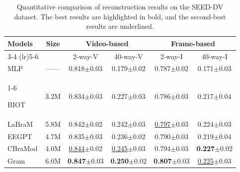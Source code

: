 \documentclass{article}
\begin{document}
\begin{table}[ht]
\footnotesize
\setlength{\tabcolsep}{2pt}

    \raggedright %
    \begin{tabular}{l c |c c c c}  
        \midrule
        \multirow{1}[3]{*}{Models} & \multirow{1}[3]{*}{Size} 
        & \multicolumn{2}{c}{Video-based} &
         \multicolumn{2}{c}{Frame-based} \\
        \cmidrule(lr){3-4} \cmidrule(lr){5-6}
        \multirow{1}{*}{} & \multirow{1}{*}{}
        & \multicolumn{1}{c}{2-way-V} 
        & \multicolumn{1}{c}{40-way-V}
        & \multicolumn{1}{c}{2-way-I} 
        & \multicolumn{1}{c}{40-way-I}\\       
        
        \midrule
        
        
       {MLP} & ------ & {{0.818\scriptsize{$\pm0.03$}}} & {0.179\scriptsize{$\pm0.02$}} & {{0.787\scriptsize{$\pm0.02$}}} & {0.171\scriptsize{$\pm0.03$}}   \\
        \cmidrule(lr){1-6}
        
        
        BIOT \cite{yang2023biot} & 3.2M& {{0.834\scriptsize{$\pm0.03$}}} & {0.227\scriptsize{$\pm0.03$}} & {{0.786\scriptsize{$\pm0.03$}}} & {0.217\scriptsize{$\pm0.04$}}   \\
        
        {LaBraM \cite{jiang2024large}} & 5.8M &{{0.842\scriptsize{$\pm0.02$}}} & {0.242\scriptsize{$\pm0.03$}} & \underline{{0.797\scriptsize{$\pm0.03$}}} & {0.224\scriptsize{$\pm0.03$}}   \\
        
        {EEGPT \cite{yue2024eegpt}} & 4.7M &{{0.835\scriptsize{$\pm0.03$}}} & {0.236\scriptsize{$\pm0.02$}} & {{0.790\scriptsize{$\pm0.03$}}} & {0.219\scriptsize{$\pm0.04$}}    \\
        {CBraMod \cite{wang2024cbramod}} & 4.0M &\underline{{0.844\scriptsize{$\pm0.02$}}} & \underline{0.245\scriptsize{$\pm0.03$}} & {{0.794\scriptsize{$\pm0.03$}}} & \textbf{0.227\scriptsize{$\pm0.02$}} \\
        
        {Gram \cite{li2025gram}} & 6.0M &\textbf{{0.847\scriptsize{$\pm0.03$}}} & \textbf{0.250\scriptsize{$\pm0.02$}} & \textbf{{0.807\scriptsize{$\pm0.03$}}} & \underline{0.225\scriptsize{$\pm0.03$}} \\
        \midrule

    \end{tabular}
    \caption{Quantitative comparison of reconstruction results on the SEED-DV dataset. The best results are highlighted in bold, and the second-best results are underlined.}
    \label{tab:ELMs}
    \vspace{-3mm}
\end{table}
\end{document}

